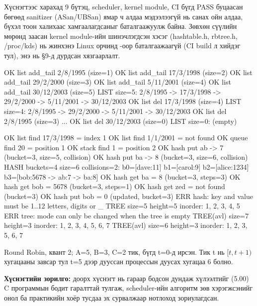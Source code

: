 Хүснэгтээс харахад 9 бүтэц, scheduler, kernel module, CI бүгд PASS буцаасан бөгөөд sanitizer (ASan/UBSan) ямар ч алдаа мэдээлээгүй нь санах ойн алдаа, бүхэл тоон халихаас хамгаалагдсаныг баталгаажуулж байна. Зөвхөн сүүлийн мөрөнд заасан kernel module-ийн шинэчлэгдсэн хэсэг (hashtable.h, rbtree.h, /proc/kds) нь жинхэнэ Linux орчинд -оор баталгаажаагүй (CI build л хийдэг тул), энэ нь §9-д дурдсан хязгаарлалт.


\begin{codeblock}
OK list add_tail 2/8/1995 (size=1)
OK list add_tail 17/3/1998 (size=2)
OK list add_tail 29/2/2000 (size=3)
OK list add_tail 5/11/2001 (size=4)
OK list add_tail 30/12/2003 (size=5)
LIST size=5: 2/8/1995 -> 17/3/1998 -> 29/2/2000 -> 5/11/2001 -> 30/12/2003
OK list del 17/3/1998 (size=4)
LIST size=4: 2/8/1995 -> 29/2/2000 -> 5/11/2001 -> 30/12/2003
OK list del 2/8/1995 (size=3)   ...   OK list del 30/12/2003 (size=0)
LIST size=0: (empty)
\end{codeblock}


\begin{codeblock}
OK list find 17/3/1998 = index 1
OK list find 1/1/2001 = not found
OK queue find 20 = position 1
OK stack find 1 = position 2
OK hash put ab -> 7 (bucket=3, size=5, collision)
OK hash put ba -> 8 (bucket=3, size=6, collision)
HASH buckets=4 size=6 collisions=2: b0=[dave:11] b1=[carol:9] b2=[alice:1234] b3=[bob:5678 -> ab:7 -> ba:8]
OK hash get ba = 8 (bucket=3, steps=3)
OK hash get bob = 5678 (bucket=3, steps=1)
OK hash get zed = not found (bucket=3)
OK hash put bob = 0 (updated, bucket=3)
ERR hash: key and value must be 1..12 letters, digits or _
TREE size=5 height=5 inorder: 1, 2, 3, 4, 5
ERR tree: mode can only be changed when the tree is empty
TREE(avl) size=7 height=3 inorder: 1, 2, 3, 4, 5, 6, 7
TREE(avl) size=6 height=3 inorder: 1, 2, 3, 5, 6, 7
\end{codeblock}


Round Robin, квант 2; A=5, B=3, C=2 тик, бүгд t=0-д ирсэн. Тик t нь $[t, t+1)$ хугацааны завсар тул t=5 дээр дууссан процессын дуусах хугацаа 6 болно.

\textbf{Хүснэгтийн зорилго:} доорх хүснэгт нь гараар бодсон дундаж хүлээлтийг (5.00) C программын бодит  гаралттай тулгаж, scheduler-ийн алгоритм зөв хэрэгжсэнийг онол ба практикийн хоёр тусдаа эх сурвалжаар нотлоход зориулагдсан.

